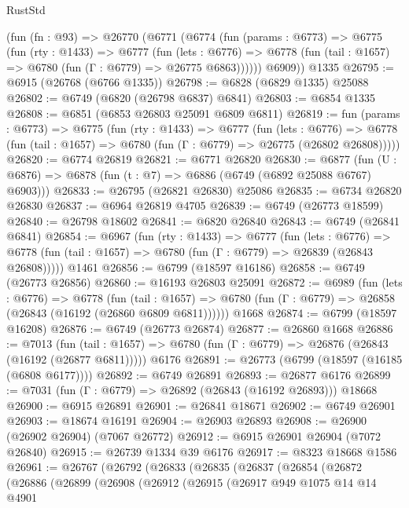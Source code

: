 \begin{lexlean}{RustStd}
\begin{coremodule}
    (fun (fn : @93) =>
    @26770
      (@6771
        (@6774
          (fun (params : @6773) =>
          @6775
            (fun (rty : @1433) =>
            @6777
              (fun (lets : @6776) =>
              @6778 (fun (tail : @1657) => @6780 (fun (Γ : @6779) => @26775 @6863))))))
        @6909))
    @1335
@26795 := @6915 (@26768 (@6766 @1335))
@26798 := @6828 (@6829 @1335) @25088
@26802 := @6749 (@6820 (@26798 @6837) @6841)
@26803 := @6854 @1335
@26808 := @6851 (@6853 @26803 @25091 @6809 @6811)
@26819 := fun (params : @6773) =>
  @6775
    (fun (rty : @1433) =>
    @6777
      (fun (lets : @6776) =>
      @6778 (fun (tail : @1657) => @6780 (fun (Γ : @6779) => @26775 (@26802 @26808)))))
@26820 := @6774 @26819
@26821 := @6771 @26820
@26830 := @6877
    (fun (U : @6876) => @6878 (fun (t : @7) => @6886 (@6749 (@6892 @25088 @6767) @6903)))
@26833 := @26795 (@26821 @26830) @25086
@26835 := @6734 @26820 @26830
@26837 := @6964 @26819 @4705
@26839 := @6749 (@26773 @18599)
@26840 := @26798 @18602
@26841 := @6820 @26840
@26843 := @6749 (@26841 @6841)
@26854 := @6967
    (fun (rty : @1433) =>
    @6777
      (fun (lets : @6776) =>
      @6778 (fun (tail : @1657) => @6780 (fun (Γ : @6779) => @26839 (@26843 @26808)))))
    @1461
@26856 := @6799 (@18597 @16186)
@26858 := @6749 (@26773 @26856)
@26860 := @16193 @26803 @25091
@26872 := @6989
    (fun (lets : @6776) =>
    @6778
      (fun (tail : @1657) =>
      @6780 (fun (Γ : @6779) => @26858 (@26843 (@16192 (@26860 @6809 @6811))))))
    @1668
@26874 := @6799 (@18597 @16208)
@26876 := @6749 (@26773 @26874)
@26877 := @26860 @1668
@26886 := @7013
    (fun (tail : @1657) => @6780 (fun (Γ : @6779) => @26876 (@26843 (@16192 (@26877 @6811)))))
    @6176
@26891 := @26773 (@6799 (@18597 (@16185 (@6808 @6177))))
@26892 := @6749 @26891
@26893 := @26877 @6176
@26899 := @7031 (fun (Γ : @6779) => @26892 (@26843 (@16192 @26893))) @18668
@26900 := @6915 @26891
@26901 := @26841 @18671
@26902 := @6749 @26901
@26903 := @18674 @16191
@26904 := @26903 @26893
@26908 := @26900 (@26902 @26904) (@7067 @26772)
@26912 := @6915 @26901 @26904 (@7072 @26840)
@26915 := @26739 @1334 @39 @6176
@26917 := @8323 @18668 @1586
@26961 := @26767
    (@26792
      (@26833
        (@26835
          (@26837
            (@26854
              (@26872
                (@26886
                  (@26899
                    (@26908
                      (@26912
                        (@26915
                          (@26917
                            @949
                            @1075
                            @14
                            @14
                            @4901

\end{coremodule}
\end{lexlean}
